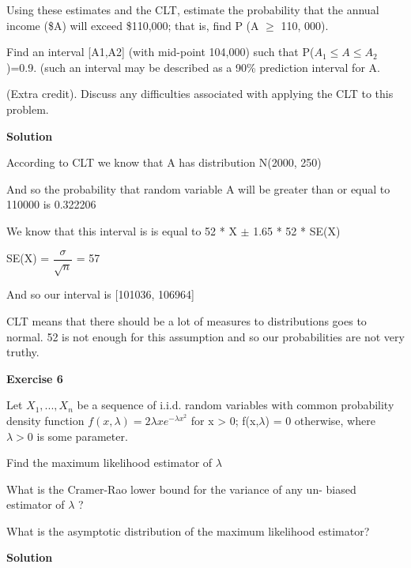 \documentclass[12pt]{article}
\begin{document}
\begin{list}{()~}{}
\item
Using these estimates and the CLT, estimate the probability that the annual income (\$A) will exceed \$110,000; that is, find P (A $\geqslant$ 110, 000).
\item
Find an interval [A1,A2] (with mid-point 104,000) such that P($A_1\leqslant A \leqslant A_2$)=0.9. (such an interval may be described as a 90\% prediction interval for A.
\item
(Extra credit). Discuss any difficulties associated with applying the CLT to this problem.
\end{list}

\medskip

\textbf{Solution}

\begin{list}{()~}{}
\item
According to CLT we know that A has distribution  N(2000, 250)

And so the probability that random variable A will be greater than or equal to 110000 is 0.322206
\item
We know that this interval is is equal to 52 * X $\pm$ 1.65 * 52 * SE(X)

SE(X) = $\dfrac{\sigma}{\sqrt{n}}$ = 57

And so our interval is [101036, 106964]
\item
CLT means that there should be a lot of measures to distributions goes to normal. 52 is not enough for this assumption and so our probabilities are not very truthy. 
\end{list}

\bigskip 

\textbf{Exercise 6}

Let $X_1,...,X_n$ be a sequence of i.i.d. random variables with common probability density function $f(x,\lambda) = 2\lambda xe^{-\lambda x^2}$
for x > 0; f(x,$\lambda$) = 0 otherwise, where $\lambda >0$ is some parameter.

\begin{list}{()~}{}
\item
Find the maximum likelihood estimator of $\lambda$
\item
What is the Cramer-Rao lower bound for the variance of any un-
biased estimator of $\lambda$ ?
\item
What is the asymptotic distribution of the maximum likelihood estimator?
\end{list}

\medskip

\textbf{Solution}

\begin{list}{()~}{}
\item
\item
\item
\end{list}
\end{document}
